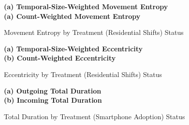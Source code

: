 \begin{figure}[ht!]
\centering
\caption{Movement Entropy by Treatment (Residential Shifts) Status}
\vspace{0.3cm}

\textbf{(a) Temporal-Size-Weighted Movement Entropy}\\


\vspace{0.3cm}
\textbf{(a) Count-Weighted Movement Entropy}\\


\label{fig:effect_of_residential_shift_on_temporal_size_weighted_count_weighted_movement_entropy}
\end{figure}


\begin{figure}[ht!]
\centering
\caption{Eccentricity by Treatment (Residential Shifts) Status}
\vspace{0.3cm}

\textbf{(a) Temporal-Size-Weighted Eccentricity}\\


\vspace{0.3cm}
\textbf{(b) Count-Weighted Eccentricity}\\


\label{fig:effect_of_residential_shift_on_temporal_size_weighted_count_weighted_eccentricity}
\end{figure}


\begin{figure}[ht!]
\centering
\caption{Total Duration by Treatment (Smartphone Adoption) Status}
\vspace{0.3cm}

\textbf{(a) Outgoing Total Duration}\\


\vspace{0.3cm}
\textbf{(b) Incoming Total Duration}\\


\label{fig:effect_of_smartphone_adoption_on_outgoing_incoming_total_duration}
\end{figure}


